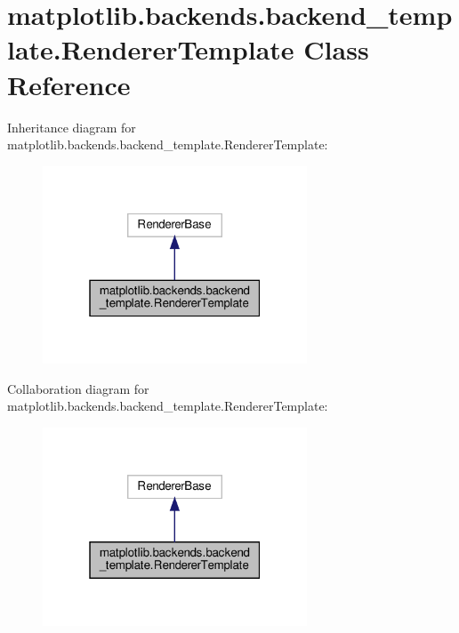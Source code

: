 \hypertarget{classmatplotlib_1_1backends_1_1backend__template_1_1RendererTemplate}{}\section{matplotlib.\+backends.\+backend\+\_\+template.\+Renderer\+Template Class Reference}
\label{classmatplotlib_1_1backends_1_1backend__template_1_1RendererTemplate}


Inheritance diagram for matplotlib.\+backends.\+backend\+\_\+template.\+Renderer\+Template\+:
\nopagebreak
\begin{figure}[H]
\begin{center}
\leavevmode
\includegraphics[width=223pt]{classmatplotlib_1_1backends_1_1backend__template_1_1RendererTemplate__inherit__graph}
\end{center}
\end{figure}


Collaboration diagram for matplotlib.\+backends.\+backend\+\_\+template.\+Renderer\+Template\+:
\nopagebreak
\begin{figure}[H]
\begin{center}
\leavevmode
\includegraphics[width=223pt]{classmatplotlib_1_1backends_1_1backend__template_1_1RendererTemplate__coll__graph}
\end{center}
\end{figure}
